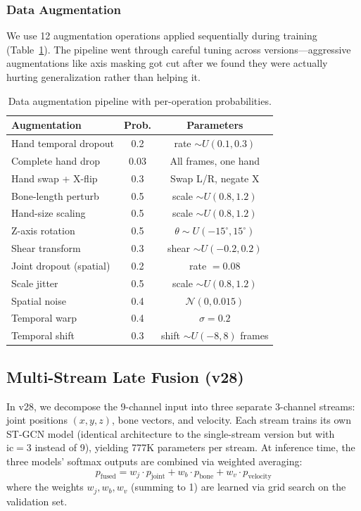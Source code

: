 \documentclass[conference]{IEEEtran}
\begin{document}
\subsubsection{Data Augmentation}
We use 12 augmentation operations applied sequentially during training (Table~\ref{tab:augmentation}). The pipeline went through careful tuning across versions---aggressive augmentations like axis masking got cut after we found they were actually hurting generalization rather than helping it.

\begin{table}[t]
\centering
\caption{Data augmentation pipeline with per-operation probabilities.}
\label{tab:augmentation}
\small
\begin{tabular}{@{}lcc@{}}
\toprule
\textbf{Augmentation} & \textbf{Prob.} & \textbf{Parameters} \\
\midrule
Hand temporal dropout & 0.2 & rate $\sim U(0.1, 0.3)$ \\
Complete hand drop & 0.03 & All frames, one hand \\
Hand swap + X-flip & 0.3 & Swap L/R, negate X \\
Bone-length perturb & 0.5 & scale $\sim U(0.8, 1.2)$ \\
Hand-size scaling & 0.5 & scale $\sim U(0.8, 1.2)$ \\
Z-axis rotation & 0.5 & $\theta \sim U(-15^{\circ}, 15^{\circ})$ \\
Shear transform & 0.3 & shear $\sim U(-0.2, 0.2)$ \\
Joint dropout (spatial) & 0.2 & rate $= 0.08$ \\
Scale jitter & 0.5 & scale $\sim U(0.8, 1.2)$ \\
Spatial noise & 0.4 & $\mathcal{N}(0, 0.015)$ \\
Temporal warp & 0.4 & $\sigma = 0.2$ \\
Temporal shift & 0.3 & shift $\sim U(-8, 8)$ frames \\
\bottomrule
\end{tabular}
\end{table}

\subsection{Multi-Stream Late Fusion (v28)}

In v28, we decompose the 9-channel input into three separate 3-channel streams: joint positions $(x,y,z)$, bone vectors, and velocity. Each stream trains its own ST-GCN model (identical architecture to the single-stream version but with $\text{ic}=3$ instead of 9), yielding 777K parameters per stream. At inference time, the three models' softmax outputs are combined via weighted averaging:
\begin{equation}
    p_{\text{fused}} = w_j \cdot p_{\text{joint}} + w_b \cdot p_{\text{bone}} + w_v \cdot p_{\text{velocity}}
\end{equation}
where the weights $w_j, w_b, w_v$ (summing to 1) are learned via grid search on the validation set.
\end{document}
